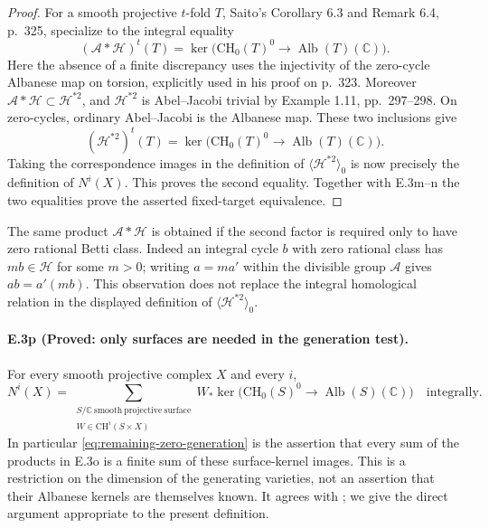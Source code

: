 \begin{proof}
For a smooth projective $t$-fold $T$, Saito's Corollary 6.3
and Remark 6.4, p.~325, specialize to the integral equality
\[
 (\mathcal A*\mathcal H)^t(T)
 =\ker\bigl(\mathrm{CH}_0(T)^0
                      \to\operatorname{Alb}(T)(\mathbb C)\bigr).
\]
Here the absence of a finite discrepancy uses the injectivity
of the zero-cycle Albanese map on torsion, explicitly used
in his proof on p.~323. Moreover
$\mathcal A*\mathcal H\subset\mathcal H^{*2}$, and
$\mathcal H^{*2}$ is Abel--Jacobi trivial by Example 1.11,
pp.~297--298. On zero-cycles, ordinary Abel--Jacobi is the
Albanese map. These two inclusions give
\[
 (\mathcal H^{*2})^t(T)
 =\ker\bigl(\mathrm{CH}_0(T)^0
                      \to\operatorname{Alb}(T)(\mathbb C)\bigr).
\]
Taking the correspondence images in the definition of
$\langle\mathcal H^{*2}\rangle_0$ is now precisely the
definition of $N^i(X)$. This proves the second equality.
Together with E.3m--n the two equalities prove the asserted
fixed-target equivalence.
\end{proof}

The same product $\mathcal A*\mathcal H$ is obtained if
the second factor is required only to have zero rational
Betti class. Indeed an integral cycle $b$ with zero rational
class has $mb\in\mathcal H$ for some $m>0$; writing
$a=ma'$ within the divisible group $\mathcal A$ gives
$ab=a'(mb)$. This observation does not replace the
integral homological relation in the displayed definition
of $\langle\mathcal H^{*2}\rangle_0$.

\paragraph{E.3p (Proved: only surfaces are needed in the
generation test).}
For every smooth projective complex $X$ and every $i$,
\begin{equation}\label{eq:surface-generated-N}
 N^i(X)=
 \sum_{\substack{S/\mathbb C\ \mathrm{smooth\ projective\ surface}\\
                 W\in\mathrm{CH}^i(S\times X)}}
 W_*\ker\bigl(\mathrm{CH}_0(S)^0
                   \to\operatorname{Alb}(S)(\mathbb C)\bigr)
 \quad\text{integrally}.
\end{equation}
In particular \eqref{eq:remaining-zero-generation} is the
assertion that every sum of the products in E.3o is a finite
sum of these surface-kernel images. This is a restriction
on the dimension of the generating varieties, not an
assertion that their Albanese kernels are themselves known.
It agrees with
\citet[Lemma 7.1.1, pp.~326--327]{cySaito1992}; we give
the direct argument appropriate to the present definition.


